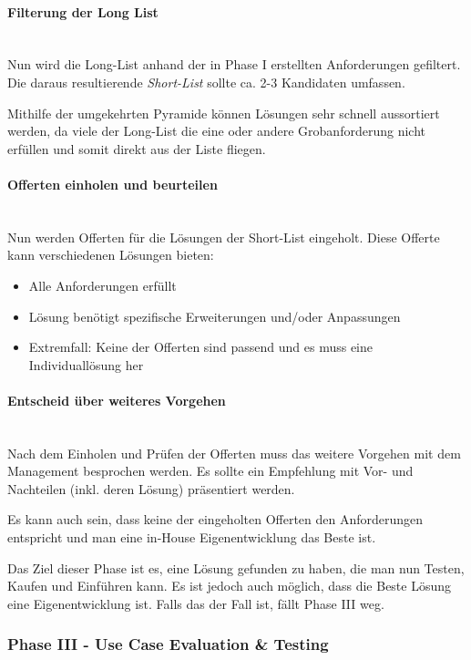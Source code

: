 \documentclass[a4paper, 11pt]{article}
\begin{document}
\paragraph{Filterung der Long List}\mbox{}\\
Nun wird die Long-List anhand der in Phase I erstellten Anforderungen gefiltert. Die daraus resultierende \textit{Short-List} sollte ca. 2-3 Kandidaten umfassen. 

Mithilfe der umgekehrten Pyramide können Lösungen sehr schnell aussortiert werden, da viele der Long-List die eine oder andere Grobanforderung nicht erfüllen und somit direkt aus der Liste fliegen.

\paragraph{Offerten einholen und beurteilen}\mbox{}\\
Nun werden Offerten für die Lösungen der Short-List eingeholt. Diese Offerte kann verschiedenen Lösungen bieten:

\begin{itemize}
	\item Alle Anforderungen erfüllt
	\item Lösung benötigt spezifische Erweiterungen und/oder Anpassungen
	\item Extremfall: Keine der Offerten sind passend und es muss eine Individuallösung her
\end{itemize}

\paragraph{Entscheid über weiteres Vorgehen}\mbox{}\\
Nach dem Einholen und Prüfen der Offerten muss das weitere Vorgehen mit dem Management besprochen werden. Es sollte ein Empfehlung mit Vor- und Nachteilen (inkl. deren Lösung) präsentiert werden.

Es kann auch sein, dass keine der eingeholten Offerten den Anforderungen entspricht und man eine in-House Eigenentwicklung das Beste ist.

\noindent Das Ziel dieser Phase ist es, eine Lösung gefunden zu haben, die man nun Testen, Kaufen und Einführen kann. Es ist jedoch auch möglich, dass die Beste Lösung eine Eigenentwicklung ist. Falls das der Fall ist, fällt Phase III weg.

\newpage

\subsubsection{Phase III - Use Case Evaluation \& Testing}
\end{document}
